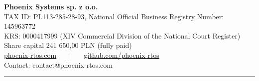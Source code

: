 {\setmainfont{Liberation Sans}
\color{ps-darkblue}
\begin{flushright}
	{\fontsize{13}{24}\selectfont \textbf{Phoenix Systems sp. z o.o.}\\}
	{\fontsize{10}{16}\selectfont TAX ID: PL113-285-28-93, National Official Business Registry Number: 145963772\\
					KRS: 0000417999 (XIV Commercial Division of the National Court Register)\\
					Share capital 241 650,00 PLN (fully paid)\\}
	\vspace{0.6cm}
	\hypersetup{colorlinks=true, urlcolor=ps-darkblue}
	{\fontsize{10}{16}\selectfont
		\href{https://phoenix-rtos.com}{phoenix-rtos.com}
		~~~|~~~
		\href{https://github.com/phoenix-rtos}{github.com/phoenix-rtos}\\
	}
	{\fontsize{10}{12}\selectfont Contact: contact@phoenix-rtos.com}
\end{flushright}

\vspace{\fill}

\noindent
{}}

\vspace{0.4cm}

\begin{center}
	\color{ps-orange}\rule{\textwidth}{2pt}
\end{center}
